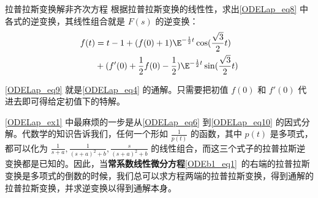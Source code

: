 \begin{example}{拉普拉斯变换解非齐次方程}
根据拉普拉斯变换的线性性，求出\autoref{ODELap_eq8} 中各式的逆变换，其线性组合就是 $F(s)$ 的逆变换：
\begin{equation}\label{ODELap_eq9}
\begin{aligned}
f(t)&=t-1+(f(0)+1)\E^{-\frac{1}{2}t}\cos(\frac{\sqrt{3}}{2}t)\\&
+(f'(0)+\frac{1}{2}f(0)-\frac{1}{2})\E^{-\frac{1}{2}t}\sin(\frac{\sqrt{3}}{2}t)
\end{aligned}
\end{equation}

\autoref{ODELap_eq9} 就是\autoref{ODELap_eq4} 的通解。只需要把初值 $f(0)$ 和 $f'(0)$ 代进去即可得给定初值下的特解。




\end{example}

\autoref{ODELap_ex1} 中最麻烦的一步是从\autoref{ODELap_eq6} 到\autoref{ODELap_eq10} 的因式分解。代数学的知识告诉我们，任何一个形如 $\frac{1}{p(t)}$ 的函数，其中 $p(t)$ 是多项式，都可以化为 $\frac{1}{s+a}, \frac{1}{(s+a)^2+b}, \frac{s}{(s+a)^2+b}$ 的线性组合，而这三个式子的拉普拉斯逆变换都是已知的。因此，当\textbf{常系数线性微分方程}\autoref{ODEb1_eq1}~的右端的拉普拉斯变换是多项式的倒数的时候，我们总可以求方程两端的拉普拉斯变换，得到通解的拉普拉斯变换，并求逆变换以得到通解本身。
















